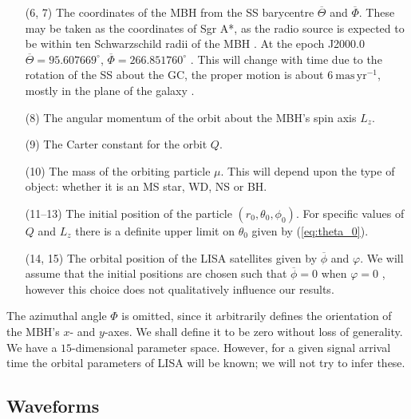 \documentclass[useAMS,usedcolumn,usegraphicx,usenatbib]{mn2e}
\newcommand{\eqnref}[1]{(\ref{eq:#1})}
\newcommand{\units}[1]{\ensuremath{~\mathrm{#1}}}
\begin{document}
\begin{enumerate}
\item[(6, 7)] The coordinates of the MBH from the SS barycentre $\overline{\Theta}$ and $\overline{\Phi}$. These may be taken as the coordinates of Sgr A*, as the radio source is expected to be within ten Schwarzschild radii of the MBH \citep{Reid2003,Doeleman2008}. At the epoch J2000.0 $\overline{\Theta} = {95.607669}^{\circ}$, $\overline{\Phi} = {266.851760}^{\circ}$ \citep{Reid1999}. This will change with time due to the rotation of the SS about the GC, the proper motion is about $6\units{mas\,yr^{-1}}$, mostly in the plane of the galaxy \citep{Reid1999, Backer1999, Reid2003}.
\item[(8)] The angular momentum of the orbit about the MBH's spin axis $L_z$.
\item[(9)] The Carter constant for the orbit $Q$.
\item[(10)] The mass of the orbiting particle $\mu$. This will depend upon the type of object: whether it is an MS star, WD, NS or BH.
\item[(11--13)] The initial position of the particle $(r_0, \theta_0, \phi_0)$. For specific values of $Q$ and $L_z$ there is a definite upper limit on $\theta_0$ given by \eqnref{theta_0}.
\item[(14, 15)] The orbital position of the LISA satellites given by $\overline{\phi}$ and $\varphi$. We will assume that the initial positions are chosen such that $\overline{\phi} = 0$ when $\varphi = 0$ \citep{Cutler1998}, however this choice does not qualitatively influence our results.\\
\end{enumerate}%
The azimuthal angle $\Phi$ is omitted, since it arbitrarily defines the orientation of the MBH's $x$- and $y$-axes. We shall define it to be zero without loss of generality. We have a $15$-dimensional parameter space. However, for a given signal arrival time the orbital parameters of LISA will be known; we will not try to infer these.

\subsection{Waveforms}
\end{document}

